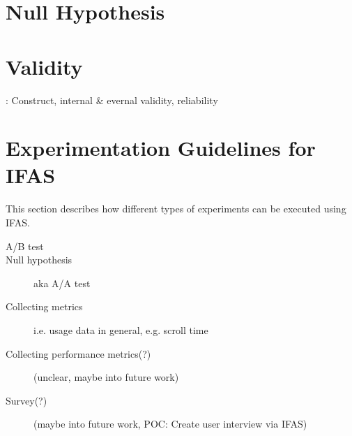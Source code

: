 \section{Null Hypothesis}





\section{Validity}
\label{sec:evaluation:validity}

\cite{Easterbrook2008a}: Construct, internal \& evernal validity, reliability

\section{Experimentation Guidelines for IFAS}

This section describes how different types of experiments can be executed using \ac{IFAS}.

\begin{description}
\item[A/B test]
\item[Null hypothesis] aka A/A test \cite{Kohavi2009}
\item[Collecting metrics] i.e. usage data in general, e.g. scroll time
\item[Collecting performance metrics(?)] (unclear, maybe into future work)
\item[Survey(?)] (maybe into future work, POC: Create user interview via \ac{IFAS})
\end{description}

